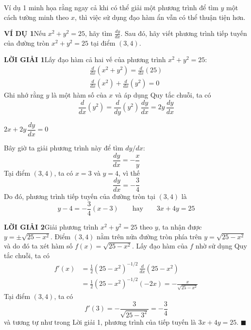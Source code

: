 \noindent
\begin{minipage}[t]{0.23\textwidth}
\raggedright
\vspace*{530pt}

\footnotesize\sffamily\color{stewartdark}
Ví dụ 1 minh họa rằng ngay cả khi có thể giải một phương trình để tìm $y$ một cách tường minh theo $x$, thì việc sử dụng đạo hàm ẩn vẫn có thể thuận tiện hơn.
\end{minipage}%
\hfill
\begin{minipage}[t]{0.73\textwidth}
\vspace*{0pt}

\noindent\textbf{\textsf{\color{stewartcyan}VÍ DỤ 1}}\hspace{1em}Nếu $x^2 + y^2 = 25$, hãy tìm $\frac{dy}{dx}$. Sau đó, hãy viết phương trình tiếp tuyến của đường tròn $x^2 + y^2 = 25$ tại điểm $(3, 4)$.

\medskip
\noindent\textbf{\textsf{\color{stewartcyan}LỜI GIẢI 1}}\hspace{1em}Lấy đạo hàm cả hai vế của phương trình $x^2 + y^2 = 25$:
\begin{gather*}
\frac{d}{dx}(x^2 + y^2) = \frac{d}{dx}(25) \\[4pt]
\frac{d}{dx}(x^2) + \frac{d}{dx}(y^2) = 0
\end{gather*}
Ghi nhớ rằng $y$ là một hàm số của $x$ và áp dụng Quy tắc chuỗi, ta có
\[
\frac{d}{dx}(y^2) = \frac{d}{dy}(y^2)\,\frac{dy}{dx} = 2y\,\frac{dy}{dx}
\]

\noindent{}\hfill $2x + 2y\,\dfrac{dy}{dx} = 0$\hfill\null
\vspace{2pt}

Bây giờ ta giải phương trình này để tìm $dy/dx$:
\[
\frac{dy}{dx} = -\frac{x}{y}
\]
Tại điểm $(3, 4)$, ta có $x = 3$ và $y = 4$, vì thế
\[
\frac{dy}{dx} = -\frac{3}{4}
\]
Do đó, phương trình tiếp tuyến của đường tròn tại $(3, 4)$ là
\[
y - 4 = -\frac{3}{4}(x - 3) \qquad\text{hay}\qquad 3x + 4y = 25
\]

\medskip
\noindent\textbf{\textsf{\color{stewartcyan}LỜI GIẢI 2}}\hspace{1em}Giải phương trình $x^2 + y^2 = 25$ theo $y$, ta nhận được $y = \pm\sqrt{25 - x^2}$. Điểm $(3, 4)$ nằm trên nửa đường tròn phía trên $y = \sqrt{25 - x^2}$ và do đó ta xét hàm số $f(x) = \sqrt{25 - x^2}$. Lấy đạo hàm của $f$ nhờ sử dụng Quy tắc chuỗi, ta có
\begin{align*}
f'(x) &= \frac{1}{2}(25 - x^2)^{-1/2}\,\frac{d}{dx}(25 - x^2) \\[6pt]
&= \frac{1}{2}(25 - x^2)^{-1/2}(-2x) = -\frac{x}{\sqrt{25 - x^2}}
\end{align*}
Tại điểm $(3, 4)$, ta có
\[
f'(3) = -\frac{3}{\sqrt{25 - 3^2}} = -\frac{3}{4}
\]
và tương tự như trong Lời giải 1, phương trình của tiếp tuyến là $3x + 4y = 25$. \hfill{\color{stewartcyan}$\blacksquare$}


\end{minipage}
